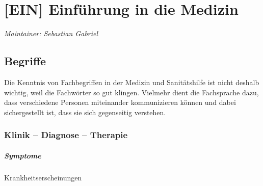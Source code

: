 \chapter{[EIN] Einführung in die Medizin}
\label{chp:EIN}

\emph{Maintainer: Sebastian Gabriel}

\minitoc


% 

\section{Begriffe}

\nocite{BrockhausDrei1Bd2}
\nocite{BrockhausDrei2Bd2}
\nocite{BrockhausDrei3Bd2}
\nocite{BertelsmannVolkslexikon25}
\nocite{Pschy259}



Die Kenntnis von Fachbegriffen in der Medizin und
Sanitätshilfe ist nicht deshalb wichtig, weil die Fachwörter
so gut klingen. Vielmehr dient die Fachsprache dazu, dass
verschiedene Personen miteinander kommunizieren können und
dabei sichergestellt ist, dass sie sich gegenseitig
verstehen.

\subsection{Klinik -- Diagnose -- Therapie}

\paragraph{Symptome}  Krankheitserscheinungen
